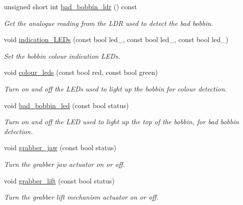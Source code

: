 \begin{DoxyCompactItemize}
unsigned short int \hyperlink{classIDP_1_1HardwareAbstractionLayer_af4a8cb5072cf89263b97a3e8e1727da8}{bad\_\-bobbin\_\-ldr} () const 
\begin{DoxyCompactList}\small\item\em Get the analogue reading from the LDR used to detect the bad bobbin. \item\end{DoxyCompactList}\item 
void \hyperlink{classIDP_1_1HardwareAbstractionLayer_a0ffde4a54900074b646efd285d9d6807}{indication\_\-LEDs} (const bool led\_, const bool led\_, const bool led\_)
\begin{DoxyCompactList}\small\item\em Set the bobbin colour indication LEDs. \item\end{DoxyCompactList}\item 
void \hyperlink{classIDP_1_1HardwareAbstractionLayer_ad2fd680723fd2d919112cad122f5c790}{colour\_\-leds} (const bool red, const bool green)
\begin{DoxyCompactList}\small\item\em Turn on and off the LEDs used to light up the bobbin for colour detection. \item\end{DoxyCompactList}\item 
void \hyperlink{classIDP_1_1HardwareAbstractionLayer_a451695e9f26f367dc58952207dac187d}{bad\_\-bobbin\_\-led} (const bool status)
\begin{DoxyCompactList}\small\item\em Turn on and off the LED used to light up the top of the bobbin, for bad bobbin detection. \item\end{DoxyCompactList}\item 
void \hyperlink{classIDP_1_1HardwareAbstractionLayer_a44d5a4c942332ba9ffe027de3dba83f0}{grabber\_\-jaw} (const bool status)
\begin{DoxyCompactList}\small\item\em Turn the grabber jaw actuator on or off. \item\end{DoxyCompactList}\item 
void \hyperlink{classIDP_1_1HardwareAbstractionLayer_a0f036b16f1f55a257c2b552035d2a1a9}{grabber\_\-lift} (const bool status)
\begin{DoxyCompactList}\small\item\em Turn the grabber lift mechanism actuator on or off. \item\end{DoxyCompactList}\end{DoxyCompactItemize}
